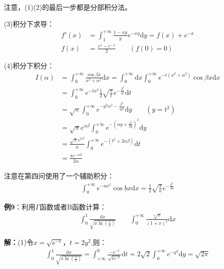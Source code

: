 \documentclass{ctexart}
\let\oldtextbf\textbf
\renewcommand{\textbf}[1]{\textcolor{brown!50!red}{\oldtextbf{#1}}}
\begin{document}
注意，(1)(2)的最后一步都是分部积分法。

(3)积分下求导：
\begin{align*}
f'(x)&=\int_1^{+\infty}\frac{1-xy}{y}e^{-xy}\mathrm{d}y=f(x)+e^{-x} \\
f(x)&=\frac{e^x-e^{-x}}{2}\qquad (f(0)=0)
\end{align*}

(4)积分下积分：
\begin{align*}
I(\alpha)&=\int_0^{+\infty}\frac{\cos\beta x}{x^2+\alpha^2}\mathrm{d}x=
\int_0^{+\infty}\mathrm{d}x\int_0^{+\infty}e^{-t(x^2+\alpha^2)}\cos\beta x\mathrm{d}x\\
&= \int_0^{+\infty} e^{-tx^2}\frac{1}{2}\sqrt{\frac{\pi}{t}}e^{-\frac{\beta^2}{4t}}\mathrm{d}t\\
&=\sqrt{\pi}\int_0^{+\infty} e^{-y^2\alpha^2-\frac{\beta^2}{4y^2}}\mathrm{d}y \qquad(y=t^2)\\
&=\sqrt{\pi}e^{\alpha\beta}\int_0^{+\infty}e^{-(\alpha y+\frac{\beta}{2y})^2}\mathrm{d}y\\
&=\frac{\sqrt{\pi}e^{\alpha\beta}}{\alpha} 
\int_0^{+\infty}e^{-(t^2+2\alpha\beta)}\mathrm{d}t\\
&=\frac{{\pi}e^{-\alpha\beta}}{2\alpha}
\end{align*}

\begin{tcolorbox}[
    colback=bac2,     %
    colframe=fra2,   %
    coltitle=white,             %
    coltext=tex2,
    title=辅助积分,
    fonttitle=\bfseries,        %
arc=3mm,                     %
breakable
]
注意在第四问使用了一个辅助积分：
\begin{align*}
\int_0^{+\infty}e^{-ax^2}\cos bx\mathrm{d}x=\frac{1}{2}\sqrt{\frac{\pi}{a}}e^{-\frac{b^2}{4a} }  
\end{align*}
\end{tcolorbox}

\textbf{\color{brown!50!red}例9}：利用$\Gamma$函数或者B函数计算：
\begin{align*}
    \int_0^1 \frac{\mathrm{d}x}{\sqrt{x\ln(\frac{1}{x})}}\qquad \int_0^{+\infty}\frac{\sqrt[4]{x}}{(1+x)^2}\mathrm{d}x
\end{align*}

\textbf{\color{brown!50!red}解：}(1)令$x=\sqrt{e^{-t}}$，$t=2y^2$,则：
\begin{align*}
\int_0^1 \frac{\mathrm{d}x}{\sqrt{x\ln(\frac{1}{x})}} =\int_{+\infty}^0
\frac{-e^{-t}}{\sqrt{te^{-t}}}\mathrm{d}t=2\sqrt{2}\int_0^{+\infty}e^{-y^2}\mathrm{d}y=\sqrt{2\pi} 
\end{align*}
\end{document}
